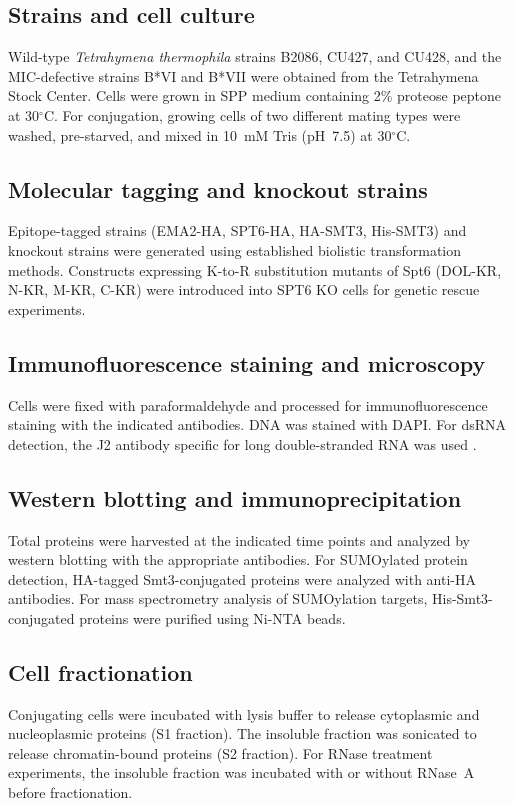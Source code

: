 \documentclass[11pt]{article}
\begin{document}
\subsection{Strains and cell culture}
Wild-type \textit{Tetrahymena thermophila} strains B2086, CU427, and CU428, and the MIC-defective strains B*VI and B*VII were obtained from the Tetrahymena Stock Center. Cells were grown in SPP medium \citep{gorovsky1975} containing 2\% proteose peptone at 30$^\circ$C. For conjugation, growing cells of two different mating types were washed, pre-starved, and mixed in 10~mM Tris (pH~7.5) at 30$^\circ$C.

\subsection{Molecular tagging and knockout strains}
Epitope-tagged strains (EMA2-HA, SPT6-HA, HA-SMT3, His-SMT3) and knockout strains were generated using established biolistic transformation methods. Constructs expressing K-to-R substitution mutants of Spt6 (DOL-KR, N-KR, M-KR, C-KR) were introduced into SPT6 KO cells for genetic rescue experiments.

\subsection{Immunofluorescence staining and microscopy}
Cells were fixed with paraformaldehyde and processed for immunofluorescence staining with the indicated antibodies. DNA was stained with DAPI. For dsRNA detection, the J2 antibody specific for long double-stranded RNA was used \citep{schoenborn1991}.

\subsection{Western blotting and immunoprecipitation}
Total proteins were harvested at the indicated time points and analyzed by western blotting with the appropriate antibodies. For SUMOylated protein detection, HA-tagged Smt3-conjugated proteins were analyzed with anti-HA antibodies. For mass spectrometry analysis of SUMOylation targets, His-Smt3-conjugated proteins were purified using Ni-NTA beads.

\subsection{Cell fractionation}
Conjugating cells were incubated with lysis buffer to release cytoplasmic and nucleoplasmic proteins (S1 fraction). The insoluble fraction was sonicated to release chromatin-bound proteins (S2 fraction). For RNase treatment experiments, the insoluble fraction was incubated with or without RNase~A before fractionation.
\end{document}
